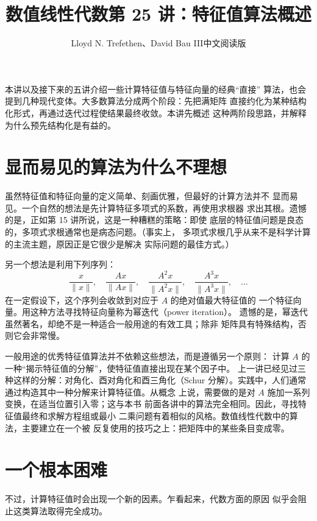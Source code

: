 \documentclass[UTF8,fontset=none,12pt]{ctexart}
\title{数值线性代数\quad 第 25 讲：特征值算法概述}
\author{Lloyd N. Trefethen、David Bau III\quad 中文阅读版}
\date{}
\begin{document}
\maketitle
\pagestyle{plain}

本讲以及接下来的五讲介绍一些计算特征值与特征向量的经典“直接”
算法，也会提到几种现代变体。大多数算法分成两个阶段：先把满矩阵
直接约化为某种结构化形式，再通过迭代过程使结果最终收敛。本讲先概述
这种两阶段思路，并解释为什么预先结构化是有益的。

\section*{显而易见的算法为什么不理想}

虽然特征值和特征向量的定义简单、刻画优雅，但最好的计算方法并不
显而易见。一个自然的想法是先计算特征多项式的系数，再使用求根器
求出其根。遗憾的是，正如第 15 讲所说，这是一种糟糕的策略：即使
底层的特征值问题是良态的，多项式求根通常也是病态问题。（事实上，
多项式求根几乎从来不是科学计算的主流主题，原因正是它很少是解决
实际问题的最佳方式。）

另一个想法是利用下列序列：
\begin{equation*}
 \frac{x}{\lVert x\rVert},\quad
 \frac{Ax}{\lVert Ax\rVert},\quad
 \frac{A^2x}{\lVert A^2x\rVert},\quad
 \frac{A^3x}{\lVert A^3x\rVert},\quad \ldots
\end{equation*}
在一定假设下，这个序列会收敛到对应于 $A$ 的绝对值最大特征值的
一个特征向量。用这种方法寻找特征向量称为幂迭代（power iteration）。
遗憾的是，幂迭代虽然著名，却绝不是一种适合一般用途的有效工具；除非
矩阵具有特殊结构，否则它会非常慢。

一般用途的优秀特征值算法并不依赖这些想法，而是遵循另一个原则：
计算 $A$ 的一种“揭示特征值的分解”，使特征值直接出现在某个因子中。
上一讲已经见过三种这样的分解：对角化、酉对角化和酉三角化（Schur
分解）。实践中，人们通常通过构造其中一种分解来计算特征值。从概念
上说，需要做的是对 $A$ 施加一系列变换，在适当位置引入零；这与本书
前面各讲中的算法完全相同。因此，寻找特征值最终和求解方程组或最小
二乘问题有着相似的风格。数值线性代数中的算法，主要建立在一个被
反复使用的技巧之上：把矩阵中的某些条目变成零。

\section*{一个根本困难}

不过，计算特征值时会出现一个新的因素。乍看起来，代数方面的原因
似乎会阻止这类算法取得完全成功。
\end{document}
